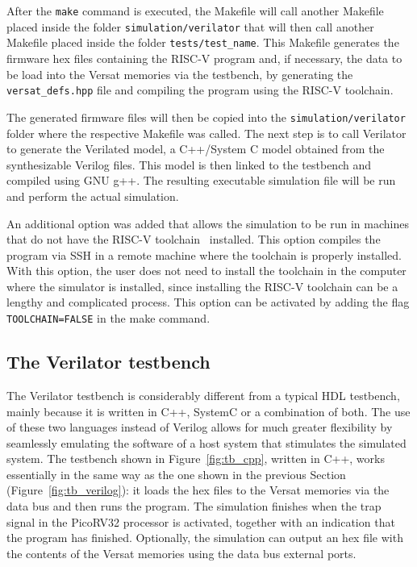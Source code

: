 \documentclass[conference]{IEEEtran}
\begin{document}
After the {\tt make} command is executed, the Makefile will call another
Makefile placed inside the folder {\tt simulation/verilator} that will then call
another Makefile placed inside the folder {\tt tests/test\_name}. This Makefile
generates the firmware hex files containing the RISC-V program and, if necessary, the 
data to be load into the Versat memories via the testbench, by generating the {\tt 
	versat\_defs.hpp} file and compiling the program using the RISC-V toolchain.

The generated firmware files will then be copied into the {\tt simulation/verilator} 
folder where the respective Makefile was called. The next step is to call
Verilator to generate the Verilated model, a C++/System C model obtained from the
synthesizable Verilog files. This model is then linked to the testbench and compiled 
using GNU g++. The resulting executable simulation file will be run and perform 
the actual simulation.

An additional option was added that allows the simulation to be run in machines
that do not have the RISC-V toolchain~\cite{gnu:riscv} installed. This option
compiles the program via SSH in a remote machine where the toolchain is properly
installed. With this option, the user does not need to install the toolchain in
the computer where the simulator is installed, since installing the RISC-V toolchain can 
be a lengthy and complicated process. This option can be activated by adding the flag 
{\tt TOOLCHAIN=FALSE} in the make command.

\subsection{The Verilator testbench}
\label{tb_verilator}

The Verilator testbench is considerably different from a typical HDL testbench,
mainly because it is written in C++, SystemC or a combination of both. The use
of these two languages instead of Verilog allows for much greater flexibility by
seamlessly emulating the software of a host system that stimulates the simulated
system. The testbench shown in Figure~\ref{fig:tb_cpp}, written in C++, works
essentially in the same way as the one shown in the previous Section
(Figure~\ref{fig:tb_verilog}): it loads the hex files to the Versat memories via
the data bus and then runs the program. The simulation finishes when the trap
signal in the PicoRV32 processor is activated, together with an indication that
the program has finished. Optionally, the simulation can output an hex file with
the contents of the Versat memories using the data bus external ports.
\end{document}
